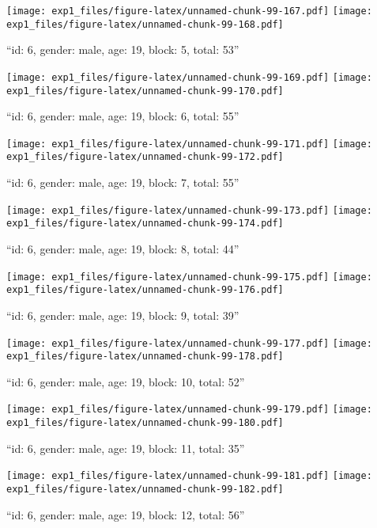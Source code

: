 \documentclass[,]{article}
\begin{document}
\texttt{[image: exp1\_files/figure-latex/unnamed-chunk-99-167.pdf]}
\texttt{[image: exp1\_files/figure-latex/unnamed-chunk-99-168.pdf]}

\newpage
[1] 

``id: 6, gender: male, age: 19, block: 5, total: 53''

\texttt{[image: exp1\_files/figure-latex/unnamed-chunk-99-169.pdf]}
\texttt{[image: exp1\_files/figure-latex/unnamed-chunk-99-170.pdf]}

\newpage
[1] 

``id: 6, gender: male, age: 19, block: 6, total: 55''

\texttt{[image: exp1\_files/figure-latex/unnamed-chunk-99-171.pdf]}
\texttt{[image: exp1\_files/figure-latex/unnamed-chunk-99-172.pdf]}

\newpage
[1] 

``id: 6, gender: male, age: 19, block: 7, total: 55''

\texttt{[image: exp1\_files/figure-latex/unnamed-chunk-99-173.pdf]}
\texttt{[image: exp1\_files/figure-latex/unnamed-chunk-99-174.pdf]}

\newpage
[1] 

``id: 6, gender: male, age: 19, block: 8, total: 44''

\texttt{[image: exp1\_files/figure-latex/unnamed-chunk-99-175.pdf]}
\texttt{[image: exp1\_files/figure-latex/unnamed-chunk-99-176.pdf]}

\newpage
[1] 

``id: 6, gender: male, age: 19, block: 9, total: 39''

\texttt{[image: exp1\_files/figure-latex/unnamed-chunk-99-177.pdf]}
\texttt{[image: exp1\_files/figure-latex/unnamed-chunk-99-178.pdf]}

\newpage
[1] 

``id: 6, gender: male, age: 19, block: 10, total: 52''

\texttt{[image: exp1\_files/figure-latex/unnamed-chunk-99-179.pdf]}
\texttt{[image: exp1\_files/figure-latex/unnamed-chunk-99-180.pdf]}

\newpage
[1] 

``id: 6, gender: male, age: 19, block: 11, total: 35''

\texttt{[image: exp1\_files/figure-latex/unnamed-chunk-99-181.pdf]}
\texttt{[image: exp1\_files/figure-latex/unnamed-chunk-99-182.pdf]}

\newpage
[1] 

``id: 6, gender: male, age: 19, block: 12, total: 56''
\end{document}
